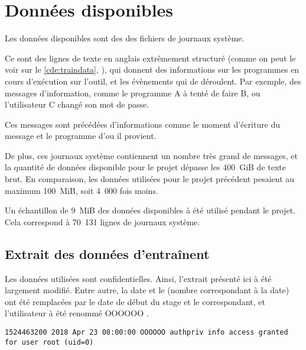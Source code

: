 \chapter{Données disponibles}\label{ch:data_papud}
Les données disponibles sont des des fichiers de journaux système.

Ce sont des lignes de texte en anglais extrêmement structuré (comme on peut le voir sur le \autoref{cde:traindata}, ),
qui donnent des informations sur les programmes en cours d'exécution sur l'outil, et les évènements qui de déroulent.
Par exemple, des messages d'information, comme \og le programme A à tenté de faire B\fg{}, ou \og l'utilisateur C changé son mot de passe\fg{}.

Ces messages sont précédées d'informations comme le moment d'écriture du message et le programme d'ou il provient.

De plus, ces journaux système contiennent un nombre très grand de messages, et la quantité de données disponible pour le projet dépasse les 400~GiB de texte brut. En comparaison, les données utilisées pour le projet précédent pesaient au maximum 100~MiB, soit 4~000 fois moins.

Un échantillon de 9~MiB des données disponibles à été utilisé pendant le projet.
Cela correspond à 70~131 lignes de journaux système.

\section{Extrait des données d'entraînent}%
Les données utilisées sont confidentielles.
Ainsi, l'extrait présenté ici à été largement modifié.
Entre autre, la date et le  (nombre correspondant à la date) ont été remplacées par le date de début du stage et le  correspondant, et l'utilisateur à été renommé \og OOOOOO \fg{}.

\begin{lstlisting}[caption={[Exemple d'une ligne extraite des journaux systèmes.]Exemple d'une ligne extraite des journaux systèmes. On a ici dans de gauche à droite~: le \foreign{timestamp}, la date, l'heure, l'utilisateur (OOOOOO), le processus (authpriv), le type de message (info), et le message.},label=cde:traindata]
	1524463200 2018 Apr 23 08:00:00 OOOOOO authpriv info access granted for user root (uid=0)
\end{lstlisting}

\pagebreak
